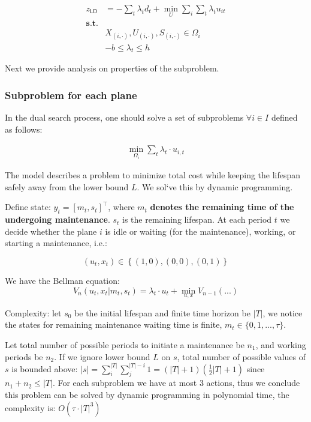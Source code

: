 \documentclass[
  a4paper,
,tablecaptionabove
]{scrartcl}
\numberwithin{equation}{section}
\begin{document}
\[\begin{aligned}
    z_{\mathsf{LD}} & = - \sum_t \lambda_t d_t  + \min_{U}\sum_i \sum_t\lambda_t u_{it} \\
    \mathbf {s.t. } &                                                                   \\
                    & X_{(i,\cdot)}, U_{(i,\cdot)}, S_{(i,\cdot)} \in \Omega_i          \\
                    & -b \le \lambda_t \le h
  \end{aligned}\]

Next we provide analysis on properties of the subproblem.

\hypertarget{subproblem-for-each-plane}{%
  \subsubsection{Subproblem for each
    plane}\label{subproblem-for-each-plane}}

In the dual search process, one should solve a set of subproblems
\(\forall i\in I\) defined as follows:

\[\begin{aligned}
    \min_{\Omega_i} \sum_t \lambda_t \cdot u_{i,t}
  \end{aligned}\]

The model describes a problem to minimize total cost while keeping the
lifespan safely away from the lower bound \(L\). We sol‘ve this by
dynamic programming.

Define state: \(y_t = \left[m_t,s_t \right]^\top\), where \(m_t\)
\textbf{denotes the remaining time of the undergoing maintenance}.
\(s_t\) is the remaining lifespan. At each period \(t\) we decide
whether the plane \(i\) is idle or waiting (for the maintenance),
working, or starting a maintenance, i.e.:

\[(u_t, x_t) \in \left\{(1, 0), (0,0), (0, 1)\right\}\]

We have the Bellman equation:
\[V_n(u_t, x_t | m_t, s_t) = \lambda_t \cdot u_t + \min_{u,x} V_{n-1}(...)\]

Complexity: let \(s_0\) be the initial lifespan and finite time horizon
be \(|T|\), we notice the states for remaining maintenance waiting time
is finite, \(m_t \in \{0, 1, ..., \tau\}\).

Let total number of possible periods to initiate a maintenance be
\(n_1\), and working periods be \(n_2\). If we ignore lower bound \(L\)
on \(s\), total number of possible values of \(s\) is bounded above:
\(|s| = \sum_i^{|T|}\sum_j^{|T| - i} 1=(|T| + 1)(\frac{1}{2}|T| + 1)\)
since \(n_1 + n_2 \le |T|\). For each subproblem we have at most 3
actions, thus we conclude this problem can be solved by dynamic
programming in polynomial time, the complexity is:
\(O\left(\tau\cdot|T|^3 \right)\)
\end{document}
